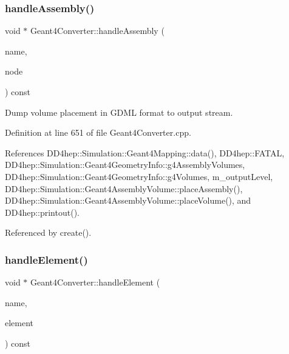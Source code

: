\subsubsection{\texorpdfstring{handle\+Assembly()}{handleAssembly()}}
{\footnotesize\ttfamily void $\ast$ Geant4\+Converter\+::handle\+Assembly (\begin{DoxyParamCaption}\item[{const std\+::string \&}]{name,  }\item[{const T\+Geo\+Node $\ast$}]{node }\end{DoxyParamCaption}) const\hspace{0.3cm}{\ttfamily [virtual]}}



Dump volume placement in G\+D\+ML format to output stream. 



Definition at line 651 of file Geant4\+Converter.\+cpp.



References D\+D4hep\+::\+Simulation\+::\+Geant4\+Mapping\+::data(), D\+D4hep\+::\+F\+A\+T\+AL, D\+D4hep\+::\+Simulation\+::\+Geant4\+Geometry\+Info\+::g4\+Assembly\+Volumes, D\+D4hep\+::\+Simulation\+::\+Geant4\+Geometry\+Info\+::g4\+Volumes, m\+\_\+output\+Level, D\+D4hep\+::\+Simulation\+::\+Geant4\+Assembly\+Volume\+::place\+Assembly(), D\+D4hep\+::\+Simulation\+::\+Geant4\+Assembly\+Volume\+::place\+Volume(), and D\+D4hep\+::printout().



Referenced by create().

\hypertarget{class_d_d4hep_1_1_simulation_1_1_geant4_converter_a81befced0851d7ffe85411f755b9a7a2}{}\label{class_d_d4hep_1_1_simulation_1_1_geant4_converter_a81befced0851d7ffe85411f755b9a7a2} 
\subsubsection{\texorpdfstring{handle\+Element()}{handleElement()}}
{\footnotesize\ttfamily void $\ast$ Geant4\+Converter\+::handle\+Element (\begin{DoxyParamCaption}\item[{const std\+::string \&}]{name,  }\item[{\hyperlink{class_d_d4hep_1_1_simulation_1_1_geant4_mapping_aa33a3f44904c6184ee883c244baa9554}{Atom}}]{element }\end{DoxyParamCaption}) const\hspace{0.3cm}{\ttfamily [virtual]}}



